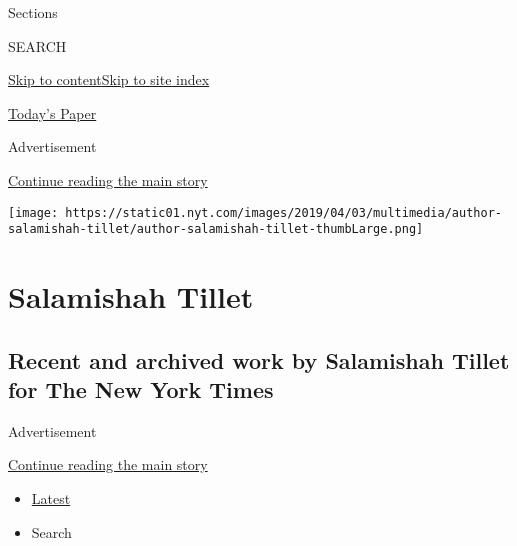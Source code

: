 Sections

SEARCH

\protect\hyperlink{site-content}{Skip to
content}\protect\hyperlink{site-index}{Skip to site index}

\href{https://myaccount.nytimes.com/auth/login?response_type=cookie\&client_id=vi}{}

\href{https://www.nytimes.com/section/todayspaper}{Today's Paper}

Advertisement

\protect\hyperlink{after-top}{Continue reading the main story}

\texttt{[image: https://static01.nyt.com/images/2019/04/03/multimedia/author-salamishah-tillet/author-salamishah-tillet-thumbLarge.png]}

\hypertarget{salamishah-tillet}{%
\section{Salamishah Tillet}\label{salamishah-tillet}}

\hypertarget{recent-and-archived-work-by-salamishah-tillet-for-the-new-york-times}{%
\subsection{Recent and archived work by Salamishah Tillet for The New
York
Times}\label{recent-and-archived-work-by-salamishah-tillet-for-the-new-york-times}}

Advertisement

\protect\hyperlink{after-mid1}{Continue reading the main story}

\begin{itemize}
\tightlist
\item
  \protect\hyperlink{stream-panel}{Latest}
\item
  Search
\end{itemize}

